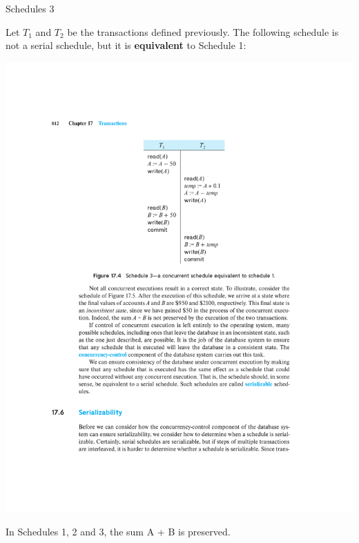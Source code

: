 \documentclass{beamer}
\begin{document}
\begin{frame}{Schedules 3}

    Let $T_1$ and $T_2$ be the transactions defined previously. The following schedule is not a serial schedule, but it is \textbf{equivalent} to Schedule 1:
    \begin{center}
        \includegraphics[width=\textwidth, trim={2cm 14.25cm 2cm 4cm}, clip]{figures/p841_schedule3}
    \end{center}
    In Schedules 1, 2 and 3, the sum A + B is preserved.

\end{frame}
\end{document}
